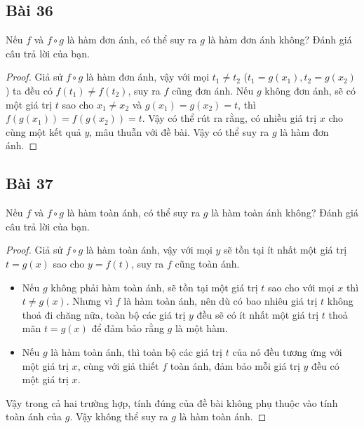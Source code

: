 \subsection*{Bài 36}
Nếu $f$ và $f\circ g$ là hàm đơn ánh, có thể suy ra $g$ là hàm đơn ánh không? Đánh giá câu trả lời của bạn.
\begin{proof}
    Giả sử $f\circ g$ là hàm đơn ánh, vậy với mọi $t_1\neq t_2$ ($t_1=g(x_1),t_2=g(x_2)$) ta đều có $f(t_1)\neq f(t_2)$, suy ra $f$ cũng đơn ánh. Nếu $g$ không đơn ánh, sẽ có một giá trị $t$ sao cho $x_1\neq x_2$ và $g(x_1)=g(x_2)=t$, thì $f(g(x_1))=f(g(x_2))=t$. Vậy có thể rút ra rằng, có nhiều giá trị $x$ cho cùng một kết quả $y$, mâu thuẫn với đề bài. Vậy có thể suy ra $g$ là hàm đơn ánh.
\end{proof}
\subsection*{Bài 37}
Nếu $f$ và $f\circ g$ là hàm toàn ánh, có thể suy ra $g$ là hàm toàn ánh không? Đánh giá câu trả lời của bạn.
\begin{proof}
    Giả sử $f\circ g$ là hàm toàn ánh, vậy với mọi $y$ sẽ tồn tại ít nhất một giá trị $t=g(x)$ sao cho $y=f(t)$, suy ra $f$ cũng toàn ánh.\begin{itemize}
        \item Nếu $g$ không phải hàm toàn ánh, sẽ tồn tại một giá trị $t$ sao cho với mọi $x$ thì $t\neq g(x)$. Nhưng vì $f$ là hàm toàn ánh, nên dù có bao nhiêu giá trị $t$ không thoả đi chăng nữa, toàn bộ các giá trị $y$ đều sẽ có ít nhất một giá trị $t$ thoả mãn $t=g(x)$ để đảm bảo rằng $g$ là một hàm.
        \item Nếu $g$ là hàm toàn ánh, thì toàn bộ các giá trị $t$ của nó đều tương ứng với một giá trị $x$, cùng với giả thiết $f$ toàn ánh, đảm bảo mỗi giá trị $y$ đều có một giá trị $x$.
    \end{itemize}
    Vậy trong cả hai trường hợp, tính đúng của đề bài không phụ thuộc vào tính toàn ánh của $g$. Vậy không thể suy ra $g$ là hàm toàn ánh.
\end{proof}
